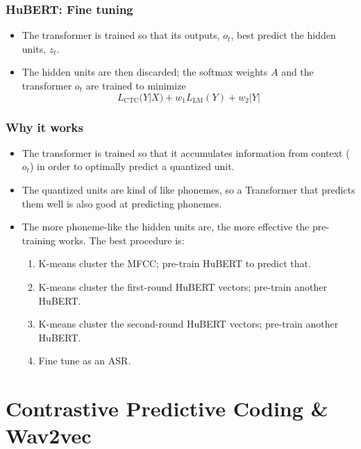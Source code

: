 \documentclass{beamer}
\begin{document}
\begin{frame}
  \frametitle{HuBERT: Fine tuning}

  \begin{itemize}
  \item The transformer is trained so that its outputs, $o_t$, best
    predict the hidden units, $z_t$.
  \item The hidden units are then discarded; the softmax weights $A$
    and the transformer $o_t$ are trained to minimize
    \begin{displaymath}
      L_{\text{CTC}}(Y|X) + w_1 L_{\text{LM}}(Y) + w_2|Y|
    \end{displaymath}
  \end{itemize}
\end{frame}

\begin{frame}
  \frametitle{Why it works}

  \begin{itemize}
  \item The transformer is trained so that it accumulates information
    from context ($o_t$) in order to optimally predict a quantized unit.
  \item The quantized units are kind of like phonemes, so a
    Transformer that predicts them well is also good at predicting
    phonemes.
  \item 
    The more phoneme-like the hidden units are, the more effective the
    pre-training works.  The best procedure is:
    \begin{enumerate}
    \item K-means cluster the MFCC; pre-train HuBERT to predict that.
    \item K-means cluster the first-round HuBERT vectors; pre-train another HuBERT.
    \item K-means cluster the second-round HuBERT vectors; pre-train another HuBERT.
    \item Fine tune as an ASR.
    \end{enumerate}
  \end{itemize}
\end{frame}

\section[CPC]{Contrastive Predictive Coding \& Wav2vec}
\setcounter{subsection}{1}
\end{document}
